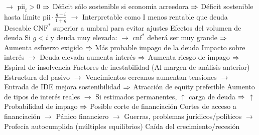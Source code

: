 \documentclass{nuevotema}
\begin{document}
\begin{esquemal}
				\4[] $\to$ $\text{pii}_t > 0$
				\4[] $\then$ Déficit sólo sostenible si economía acreedora
				\4[] $\then$ Déficit sostenible hasta límite $\text{pii}\cdot \frac{g-i}{1+g}$
				\4[] $\to$ Interpretable como I menos rentable que deuda
				\4[$\then$] Deseable $\text{CNF}^*$ superior a umbral para evitar ajustes
				\4 Efectos del volumen de deuda
				\4[] Si $g<i$ y deuda muy elevada:
				\4[] $\to$ $\text{cnf}^*$ deberá ser muy grande
				\4[] $\then$ Aumenta esfuerzo exigido
				\4[] $\then$ Más probable impago de la deuda
				\4[] Impacto sobre interés
				\4[] $\to$ Deuda elevada aumenta interés
				\4[] $\then$ Aumenta riesgo de impago
				\4[] $\then$ Espiral de insolvencia
				\4 Factores de inestabilidad
				\4[] (Al margen de análisis anterior)
				\4[] Estructura del pasivo
				\4[] $\to$ Vencimientos cercanos aumentan tensiones
				\4[] $\to$ Entrada de IDE mejora sostenibilidad
				\4[] $\then$ Atracción de equity preferible
				\4[] Aumento de tipos de interés reales
				\4[] $\to$ Si estimados permanentes, $\uparrow$ carga de deuda
				\4[] $\then$ $\uparrow$ Probabilidad de impago
				\4[] $\then$ Posible corte de financiación
				\4[] Cortes de acceso a financiación
				\4[] $\to$ Pánico financiero
				\4[] $\to$ Guerras, problemas jurídicos/políticos
				\4[] $\to$ Profecía autocumplida (múltiples equilibrios)
				\4[] Caída del crecimiento/recesión


\end{esquemal}
\end{document}
